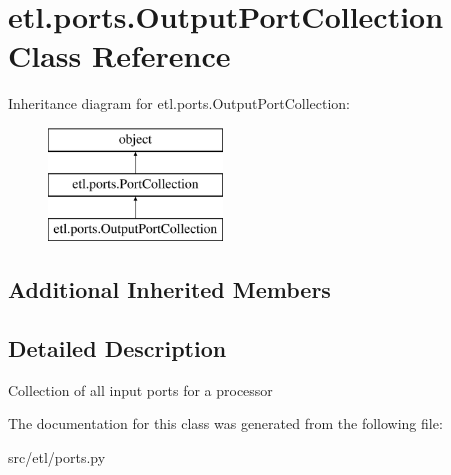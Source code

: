 \hypertarget{classetl_1_1ports_1_1OutputPortCollection}{\section{etl.\-ports.\-Output\-Port\-Collection Class Reference}
\label{classetl_1_1ports_1_1OutputPortCollection}
}
Inheritance diagram for etl.\-ports.\-Output\-Port\-Collection\-:\begin{figure}[H]
\begin{center}
\leavevmode
\includegraphics[height=3.000000cm]{classetl_1_1ports_1_1OutputPortCollection}
\end{center}
\end{figure}
\subsection*{Additional Inherited Members}


\subsection{Detailed Description}
\begin{DoxyVerb}Collection of all input ports for a processor\end{DoxyVerb}
 

The documentation for this class was generated from the following file\-:\begin{DoxyCompactItemize}
\item 
src/etl/ports.\-py\end{DoxyCompactItemize}
